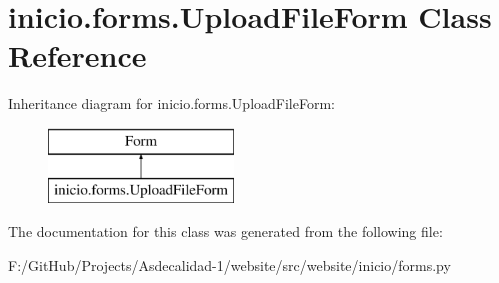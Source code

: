 \hypertarget{classinicio_1_1forms_1_1_upload_file_form}{}\section{inicio.\+forms.\+Upload\+File\+Form Class Reference}
\label{classinicio_1_1forms_1_1_upload_file_form}
Inheritance diagram for inicio.\+forms.\+Upload\+File\+Form\+:\begin{figure}[H]
\begin{center}
\leavevmode
\includegraphics[height=2.000000cm]{classinicio_1_1forms_1_1_upload_file_form}
\end{center}
\end{figure}


The documentation for this class was generated from the following file\+:\begin{DoxyCompactItemize}
\item 
F\+:/\+Git\+Hub/\+Projects/\+Asdecalidad-\/1/website/src/website/inicio/forms.\+py\end{DoxyCompactItemize}
